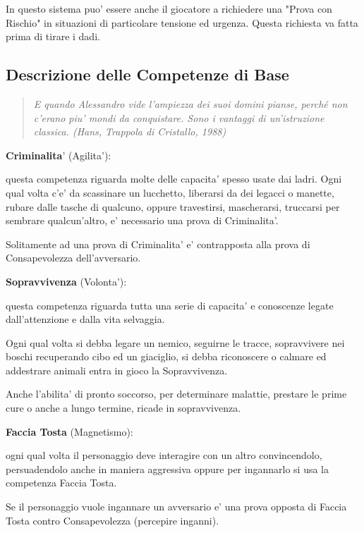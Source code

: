 \documentclass[a4paper,11pt,twoside,openany]{book}
\begin{document}
In questo sistema puo' essere anche il giocatore a richiedere una "Prova con Rischio" in situazioni di particolare tensione ed urgenza. Questa richiesta va fatta prima di tirare i dadi.

\pagebreak

\subsection{Descrizione delle Competenze di Base}

\label{descrizione-delle-competenze-di-base}
\begin{quote}\textit{
E quando Alessandro vide l'ampiezza dei suoi domini pianse, perché non c'erano piu' mondi da conquistare. Sono i vantaggi di un'istruzione classica. (Hans, Trappola di Cristallo, 1988)
}\end{quote}

\textbf{Criminalita}' (Agilita'):

questa competenza riguarda molte delle capacita' spesso usate dai ladri. Ogni qual volta c'e' da scassinare un lucchetto, liberarsi da dei legacci o manette, rubare dalle tasche di qualcuno, oppure travestirsi, mascherarsi, truccarsi per sembrare qualcun'altro, e' necessario una prova di Criminalita'.

Solitamente ad una prova di Criminalita' e' contrapposta alla prova di Consapevolezza dell'avversario.

\textbf{Sopravvivenza} (Volonta'):

questa competenza riguarda tutta una serie di capacita' e conoscenze legate dall'attenzione e dalla vita selvaggia.

Ogni qual volta si debba legare un nemico, seguirne le tracce, sopravvivere nei boschi recuperando cibo ed un giaciglio,  si debba riconoscere o calmare ed addestrare animali entra in gioco la Sopravvivenza.

Anche l'abilita' di pronto soccorso, per determinare malattie, prestare le prime cure o anche a lungo termine, ricade in sopravvivenza.

\textbf{Faccia Tosta} (Magnetismo):

ogni qual volta il personaggio deve interagire con un altro convincendolo, persuadendolo anche in maniera aggressiva oppure per ingannarlo si usa la competenza Faccia Tosta.

Se il personaggio vuole ingannare un avversario e' una prova opposta di Faccia Tosta contro Consapevolezza (percepire inganni).
\end{document}
